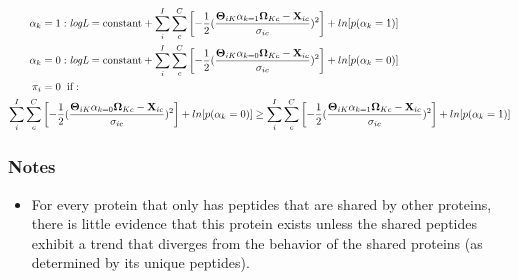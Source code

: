 \documentclass[12pt]{article}
\begin{document}
\begin{align}
\alpha_{k} &= 1: \textit{logL} = \text{constant} + \sum_{i}^{I}\sum_{c}^{C}\left[{-\frac{1}{2}(\frac{\mathbf{\Theta}_{iK}\alpha_{k  = 1}\mathbf{\Omega}_{Kc} - \textbf{X}_{ic}}{\sigma_{ic}})^2}\right] + ln[p(\alpha_{k} = 1)]\notag\\
\alpha_{k} &= 0: \textit{logL} = \text{constant} + \sum_{i}^{I}\sum_{c}^{C}\left[{-\frac{1}{2}(\frac{\mathbf{\Theta}_{iK}\alpha_{k  = 0}\mathbf{\Omega}_{Kc} - \textbf{X}_{ic}}{\sigma_{ic}})^2}\right] + ln[p(\alpha_{k} = 0)]\notag\\
\pi_{i} &= 0 \hspace{2mm}\text{if}:\notag\\ \sum_{i}^{I}\sum_{c}^{C}&\left[{-\frac{1}{2}(\frac{\mathbf{\Theta}_{iK}\alpha_{k  = 0}\mathbf{\Omega}_{Kc} - \textbf{X}_{ic}}{\sigma_{ic}})^2}\right] + ln[p(\alpha_{k} = 0)] \ge \sum_{i}^{I}\sum_{c}^{C}\left[{-\frac{1}{2}(\frac{\mathbf{\Theta}_{iK}\alpha_{k  = 1}\mathbf{\Omega}_{Kc} - \textbf{X}_{ic}}{\sigma_{ic}})^2}\right] + ln[p(\alpha_{k} = 1)]
\end{align}

\subsubsection*{Notes}

\begin{itemize}
\item For every protein that only has peptides that are shared by other proteins, there is little evidence that this protein exists unless the shared peptides exhibit a trend that diverges from the behavior of the shared proteins (as determined by its unique peptides).  
\end{itemize}
\end{document}
